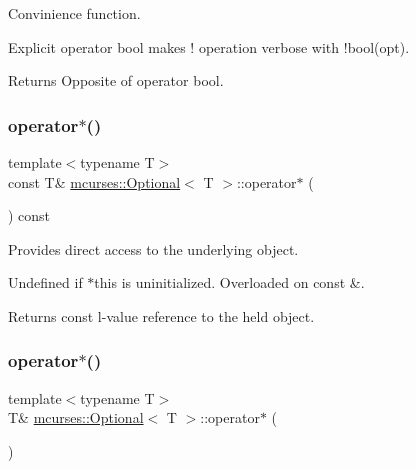 Convinience function. 

Explicit operator bool makes ! operation verbose with !bool(opt). \begin{DoxyReturn}{Returns}
Opposite of operator bool. 
\end{DoxyReturn}
\hypertarget{classmcurses_1_1Optional_a080bc167c71a50bdbe27944c2e9b6019}{}\label{classmcurses_1_1Optional_a080bc167c71a50bdbe27944c2e9b6019} 
\subsubsection{\texorpdfstring{operator$\ast$()}{operator*()}\hspace{0.1cm}{\footnotesize\ttfamily [1/3]}}
{\footnotesize\ttfamily template$<$typename T$>$ \\
const T\& \hyperlink{classmcurses_1_1Optional}{mcurses\+::\+Optional}$<$ T $>$\+::operator$\ast$ (\begin{DoxyParamCaption}{ }\end{DoxyParamCaption}) const\hspace{0.3cm}{\ttfamily [inline]}}



Provides direct access to the underlying object. 

Undefined if $\ast$this is uninitialized. Overloaded on const \&. \begin{DoxyReturn}{Returns}
const l-\/value reference to the held object. 
\end{DoxyReturn}
\hypertarget{classmcurses_1_1Optional_a2f816c249fc38f69c5c395fdf7d41ca8}{}\label{classmcurses_1_1Optional_a2f816c249fc38f69c5c395fdf7d41ca8} 
\subsubsection{\texorpdfstring{operator$\ast$()}{operator*()}\hspace{0.1cm}{\footnotesize\ttfamily [2/3]}}
{\footnotesize\ttfamily template$<$typename T$>$ \\
T\& \hyperlink{classmcurses_1_1Optional}{mcurses\+::\+Optional}$<$ T $>$\+::operator$\ast$ (\begin{DoxyParamCaption}{ }\end{DoxyParamCaption})\hspace{0.3cm}{\ttfamily [inline]}}



